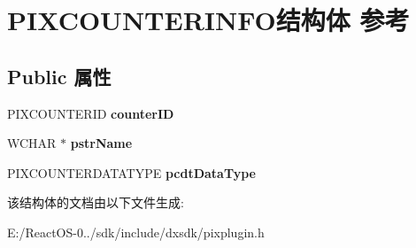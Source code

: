 \hypertarget{struct_p_i_x_c_o_u_n_t_e_r_i_n_f_o}{}\section{P\+I\+X\+C\+O\+U\+N\+T\+E\+R\+I\+N\+F\+O结构体 参考}
\label{struct_p_i_x_c_o_u_n_t_e_r_i_n_f_o}
\subsection*{Public 属性}
\begin{DoxyCompactItemize}
\item 
\mbox{\label{struct_p_i_x_c_o_u_n_t_e_r_i_n_f_o_a0d2b163967e3380b8bf9b684fb389bea}} 
P\+I\+X\+C\+O\+U\+N\+T\+E\+R\+ID {\bfseries counter\+ID}
\item 
\mbox{\label{struct_p_i_x_c_o_u_n_t_e_r_i_n_f_o_a2cd3ac58f566657bf3581d49fa6a2446}} 
W\+C\+H\+AR $\ast$ {\bfseries pstr\+Name}
\item 
\mbox{\label{struct_p_i_x_c_o_u_n_t_e_r_i_n_f_o_a5ea9ce7e66d813decb963387e2538174}} 
P\+I\+X\+C\+O\+U\+N\+T\+E\+R\+D\+A\+T\+A\+T\+Y\+PE {\bfseries pcdt\+Data\+Type}
\end{DoxyCompactItemize}


该结构体的文档由以下文件生成\+:\begin{DoxyCompactItemize}
\item 
E\+:/\+React\+O\+S-\/0../sdk/include/dxsdk/pixplugin.\+h\end{DoxyCompactItemize}
